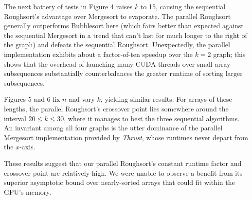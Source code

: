 \documentclass[letterpaper, 12pt]{article}
\begin{document}
The next battery of tests in Figure 4 raises $k$ to 15, causing the sequential Roughsort's advantage over Mergesort to evaporate.
The parallel Roughsort generally outperforms Bubblesort here (which fairs better than expected against the sequential Mergesort
  in a trend that can't last for much longer to the right of the graph) and defeats the sequential Roughsort.
Unexpectedly, the parallel implementation exhibits about a factor-of-ten speedup over the $k = 2$ graph; this shows that
  the overhead of launching many CUDA threads over small array subsequences substantially counterbalances the greater runtime
  of sorting larger subsequences.

Figures 5 and 6 fix $n$ and vary $k$, yielding similar results.
For arrays of these lengths, the parallel Roughsort's crossover point lies somewhere around the interval $20 \leq k \leq 30$,
  where it manages to best the three sequential algorithms.
An invariant among all four graphs is the utter dominance of the parallel Mergesort implementation provided by \textit{Thrust},
  whose runtimes never depart from the $x$-axis.

These results suggest that our parallel Roughsort's constant runtime factor and crossover point are relatively high.
We were unable to observe a benefit from its superior asymptotic bound over nearly-sorted arrays that could fit within the
GPU's memory.

\begin{sidewaysfigure}

\vspace{-4ex}
\caption{\label{fig:k2}{\em
  Sort Runtimes over Arrays of Length $n\cdot 10^6$, $k = 2$
}}
\end{sidewaysfigure}

\begin{sidewaysfigure}

\vspace{-4ex}
\caption{\label{fig:k15}{\em
  Sort Runtimes over Arrays of Length $n\cdot 10^6$, $k = 15$
}}
\end{sidewaysfigure}

\begin{sidewaysfigure}

\vspace{-4ex}
\caption{\label{fig:n750k}{\em
  Sort Runtimes over Arrays of Radius $k$, $n = 0.75\cdot 10^6$
}}
\end{sidewaysfigure}

\begin{sidewaysfigure}

\vspace{-4ex}
\caption{\label{fig:n1250k}{\em
  Sort Runtimes over Arrays of Radius $k$, $n = 1.25\cdot 10^6$
}}
\end{sidewaysfigure}
\end{document}
